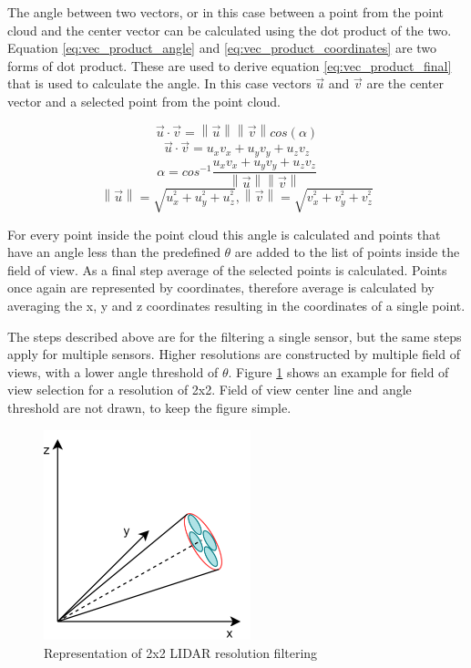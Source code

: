 The angle between two vectors, or in this case between a point from the point cloud and the center vector 
can be calculated using the dot product of the two. Equation \ref{eq:vec_product_angle} and 
\ref{eq:vec_product_coordinates} are two forms of dot product. These are used to derive equation 
\ref{eq:vec_product_final} that is used to calculate the angle. In this case vectors $\vec{u}$ and 
$\vec{v}$ are the center vector and a selected point from the point cloud. 


\begin{equation} \label{eq:vec_product_angle}
    \vec{u}\cdot\vec{v}=\left\|\vec{u}\right\|\left\|\vec{v}\right\|cos(\alpha)
\end{equation}
\begin{equation} \label{eq:vec_product_coordinates}
    \vec{u}\cdot\vec{v}=u_{x}v_{x}+u_{y}v_{y}+u_{z}v_{z}
\end{equation}
\begin{equation} \label{eq:vec_product_final}
    \alpha = cos^{-1}\frac{u_{x}v_{x}+u_{y}v_{y}+u_{z}v_{z}}{\left\|\vec{u}\right\|\left\|\vec{v}\right\|}
\end{equation}
\begin{equation} \label{eq:vec_length}
\left\|\vec{u}\right\| = \sqrt{u_{x}^{^{2}}+u_{y}^{^{2}}+u_{z}^{^{2}}}, \left\|\vec{v}\right\| = \sqrt{v_{x}^{^{2}}+v_{y}^{^{2}}+v_{z}^{^{2}}}
\end{equation}

For every point inside the point cloud this angle is calculated and points that have an angle less than the 
predefined $\theta$ are added to the list of points inside the field of view. As a final step average of the 
selected points is calculated. Points once again are represented by coordinates, therefore average is calculated 
by averaging the x, y and z coordinates resulting in the coordinates of a single point.

The steps described above are for the filtering a single sensor, but the same steps apply for multiple 
sensors. Higher resolutions are constructed by multiple field of views, with a lower angle threshold of 
$\theta$. Figure \ref{fig:data_angle_filter_high_res} shows an example for field of view selection for 
a resolution of 2x2. Field of view center line and angle threshold are not drawn, to keep the figure simple. 

\begin{figure}[!ht]
    \centering
    \includegraphics[width=60mm, keepaspectratio]{figures/data_angle_filter_high_res.png}
    \caption{Representation of 2x2 LIDAR resolution filtering}
    \label{fig:data_angle_filter_high_res}
\end{figure}

